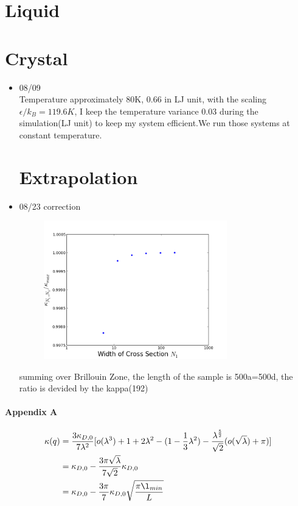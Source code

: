 \documentclass{article}
\begin{document}
\section*{Liquid}
\section*{Crystal}
\begin{itemize}
\item \mbox{08/09}\\
Temperature approximately 80K, 0.66 in LJ unit, with the scaling $\epsilon/k_B=119.6K$, I keep the temperature variance 0.03 during the simulation(LJ unit) to keep my system efficient.We run those systems at constant temperature.
\section*{Extrapolation}
\item \mbox{08/23} correction\\
\begin{figure}[h]
    \includegraphics[height=6cm]{Cross5.png}
\end{figure}
summing over Brillouin Zone, the length of the sample is 500a=500d, the ratio is devided by the kappa(192)
\end{itemize}
\paragraph*{Appendix A}
\begin{align*}
\kappa(q)&=\frac{3\kappa_{D,0}}{7\lambda^2}[o(\lambda^3)+1+2\lambda^2-(1-\frac{1}{3}\lambda^2)-\frac{\lambda^{\frac{5}{2}}}{\sqrt{2}}(o(\sqrt{\lambda})+\pi)] \\
&=\kappa_{D,0}-\frac{3\pi\sqrt{\lambda}} {7\sqrt{2}}\kappa_{D,0}\\
&=\kappa_{D,0}-\frac{3\pi} {7}\kappa_{D,0}\sqrt{\frac{\pi \l_{min}}{L}}
\end{align*}
\end{document}
